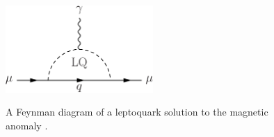 \begin{figure}[H]
    \centering
    {\includegraphics[width=0.5\textwidth]{Images/Theory/Muon_gminus2_LQ.pdf}}
    \caption{A Feynman diagram of a leptoquark solution to the magnetic anomaly \amuon.}
    \label{fig:amuLQ}
\end{figure}